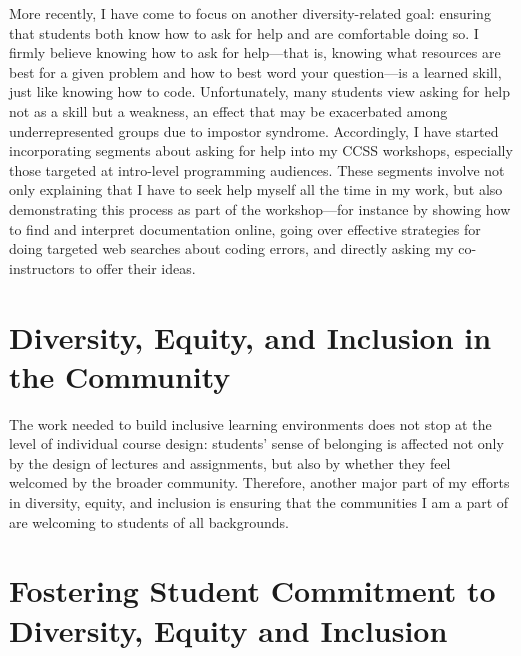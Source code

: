 \documentclass[12pt,letterpaper]{article}
\begin{document}
More recently, I have come to focus on another diversity-related goal: ensuring that students both know how to ask for help and are comfortable doing so.
I firmly believe knowing how to ask for help---that is, knowing what resources are best for a given problem and how to best word your question---is a learned skill, just like knowing how to code.
Unfortunately, many students view asking for help not as a skill but a weakness, an effect that may be exacerbated among underrepresented groups due to impostor syndrome.
Accordingly, I have started incorporating segments about asking for help into my CCSS workshops, especially those targeted at intro-level programming audiences.
These segments involve not only explaining that I have to seek help myself all the time in my work, but also demonstrating this process as part of the workshop---for instance by showing how to find and interpret documentation online, going over effective strategies for doing targeted web searches about coding errors, and directly asking my co-instructors to offer their ideas.

\section{Diversity, Equity, and Inclusion in the Community}
The work needed to build inclusive learning environments does not stop at the level of individual course design: students' sense of belonging is affected not only by the design of lectures and assignments, but also by whether they feel welcomed by the broader community.
Therefore, another major part of my efforts in diversity, equity, and inclusion is ensuring that the communities I am a part of are welcoming to students of all backgrounds.

\section{Fostering Student Commitment to Diversity, Equity and Inclusion}
\end{document}
